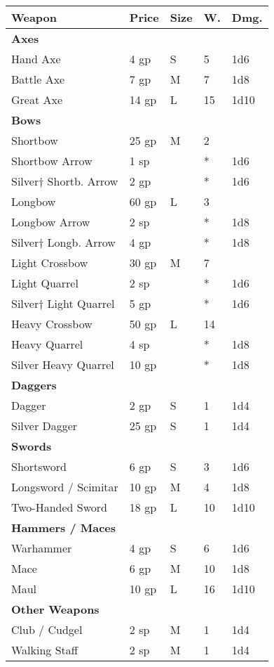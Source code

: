 \documentclass[a4paper,twoside,openany,10pt]{book}
\begin{document}
\begin{multicols}{2}
\begin{tabular*}{0.93\linewidth}{@{\extracolsep{\fill}}lllll}
\textbf{Weapon} & \textbf{Price} & \textbf{Size} & \textbf{W.} & \textbf{Dmg}. \\\toprule
\textbf{Axes} & & & & \\\hline
Hand Axe & 4 gp & S & 5 & 1d6 \\\hline
Battle Axe & 7 gp & M & 7 & 1d8 \\\hline
Great Axe & 14 gp & L & 15 & 1d10 \\\hline
\textbf{Bows} & & & & \\\hline
Shortbow & 25 gp & M & 2 & \\\hline
Shortbow Arrow & 1 sp & & * & 1d6 \\\hline
Silver† Shortb. Arrow & 2 gp & & * & 1d6 \\\hline
Longbow & 60 gp & L & 3 & \\\hline
Longbow Arrow & 2 sp & & * & 1d8 \\\hline
Silver† Longb. Arrow & 4 gp & & * & 1d8 \\\hline
Light Crossbow & 30 gp & M & 7 & \\\hline
Light Quarrel & 2 sp & & * & 1d6 \\\hline
Silver† Light Quarrel & 5 gp & & * & 1d6 \\\hline
Heavy Crossbow & 50 gp & L & 14 & \\\hline
Heavy Quarrel & 4 sp & & * & 1d8 \\\hline
Silver Heavy Quarrel & 10 gp & & * & 1d8 \\\hline
\textbf{Daggers} & & & & \\\hline
Dagger & 2 gp & S & 1 & 1d4 \\\hline
Silver Dagger & 25 gp & S & 1 & 1d4 \\\hline
\textbf{Swords} & & & & \\\hline
Shortsword & 6 gp & S & 3 & 1d6 \\\hline
Longsword / Scimitar & 10 gp & M & 4 & 1d8 \\\hline
Two-Handed Sword & 18 gp & L & 10 & 1d10 \\\hline
\textbf{Hammers / Maces} & & & & \\\hline
Warhammer & 4 gp & S & 6 & 1d6 \\\hline
Mace & 6 gp & M & 10 & 1d8 \\\hline
Maul & 10 gp & L & 16 & 1d10 \\\hline
\textbf{Other Weapons} & & & & \\\hline
Club / Cudgel & 2 sp & M & 1 & 1d4 \\\hline
Walking Staff & 2 sp & M & 1 & 1d4 \\\hline

\end{tabular*}
\end{multicols}
\end{document}
